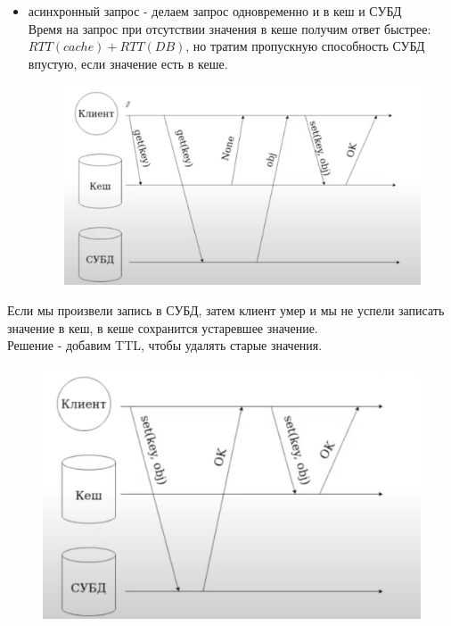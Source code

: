 \begin{itemize}
\begin{itemize}
\begin{figure}[h]
                \caption{}
            \end{figure}
            \item асинхронный запрос - делаем запрос одновременно и в кеш и СУБД \\
            Время на запрос при отсутствии значения в кеше получим ответ быстрее: $RTT(cache) + RTT(DB)$, но тратим пропускную способность СУБД впустую, если значение есть в кеше.\\
            \begin{figure}[h]
                \centering
                \includegraphics[scale = 0.5]{../assets/20.png}
                \caption{}
            \end{figure}
        \end{itemize}
        Если мы произвели запись в СУБД, затем клиент умер и мы не успели записать значение в кеш, в кеше сохранится устаревшее значение. \\
        Решение - добавим TTL, чтобы удалять старые значения.\\
        \begin{figure}[h]
            \centering
            \includegraphics[scale = 0.5]{../assets/21.png}

\end{figure}
\end{itemize}
